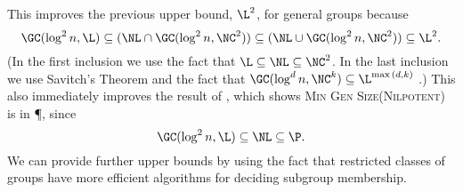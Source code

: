 \documentclass{article}
\begin{document}
This improves the previous upper bound, $\L^2$, for general groups because
\begin{equation*}
  \GC(\log^2 n, \L) \subseteq (\NL \cap \GC(\log^2 n, \NC^2)) \subseteq (\NL \cup \GC(\log^2 n, \NC^2)) \subseteq \L^2.
\end{equation*}
(In the first inclusion we use the fact that $\L \subseteq \NL \subseteq \NC^2$.
In the last inclusion we use Savitch's Theorem and the fact that $\GC(\log^d n, \NC^k) \subseteq \L^{\max{(d, k)}}$ \cite[Lemma~3.1]{wolf94}.)
This also immediately improves the result of \cite[Theorem~7]{at06}, which shows \textsc{Min Gen Size(Nilpotent)} is in \P, since
\begin{equation*}
  \GC(\log^2 n, \L) \subseteq \NL \subseteq \P.
\end{equation*}
We can provide further upper bounds by using the fact that restricted classes of groups have more efficient algorithms for deciding subgroup membership.
\end{document}

